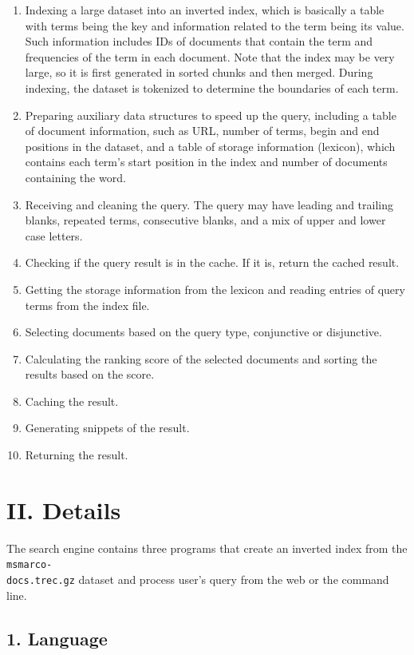 \documentclass[12pt]{article}
\begin{document}
\begin{enumerate}
\def\labelenumi{\arabic{enumi}.}
\item
  Indexing a large dataset into an inverted index, which is basically a
  table with terms being the key and information related to the term
  being its value. Such information includes IDs of documents that
  contain the term and frequencies of the term in each document. Note
  that the index may be very large, so it is first generated in sorted
  chunks and then merged. During indexing, the dataset is tokenized to
  determine the boundaries of each term.
\item
  Preparing auxiliary data structures to speed up the query, including a
  table of document information, such as URL, number of terms, begin and
  end positions in the dataset, and a table of storage information
  (lexicon), which contains each term's start position in the index and
  number of documents containing the word.
\item
  Receiving and cleaning the query. The query may have leading and
  trailing blanks, repeated terms, consecutive blanks, and a mix of
  upper and lower case letters.
\item
  Checking if the query result is in the cache. If it is, return the
  cached result.
\item
  Getting the storage information from the lexicon and reading entries
  of query terms from the index file.
\item
  Selecting documents based on the query type, conjunctive or
  disjunctive.
\item
  Calculating the ranking score of the selected documents and sorting
  the results based on the score.
\item
  Caching the result.
\item
  Generating snippets of the result.
\item
  Returning the result.
\end{enumerate}

\hypertarget{ii-details}{%
\section{II. Details}\label{ii-details}}

The search engine contains three programs that create an inverted index
from the \texttt{msmarco-\\docs.trec.gz} dataset and process user's query
from the web or the command line.

\hypertarget{1-language}{%
\subsection{1. Language}\label{1-language}}
\end{document}
